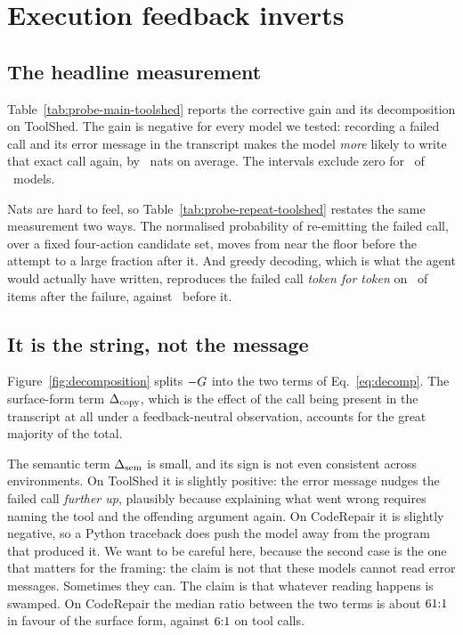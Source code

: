 \section{Execution feedback inverts}
\label{sec:results}

\subsection{The headline measurement}

Table~\ref{tab:probe-main-toolshed} reports the corrective gain and its
decomposition on ToolShed. The gain is negative for every model we tested:
recording a failed call and its error message in the transcript makes the model
\emph{more} likely to write that exact call again, by \MeanG\ nats on average.
The intervals exclude zero for \NumModelsNegativeG\ of
\NumModelsToolshed\ models.



Nats are hard to feel, so Table~\ref{tab:probe-repeat-toolshed} restates the
same measurement two ways. The normalised probability of re-emitting the failed
call, over a fixed four-action candidate set, moves from near the floor before
the attempt to a large fraction after it. And greedy decoding, which is what the agent would actually have written,
reproduces the failed call \emph{token for
token} on \GreedyPostMean\ of items after the failure, against \GreedyPreMean\
before it.



\subsection{It is the string, not the message}

Figure~\ref{fig:decomposition} splits $-G$ into the two terms of
Eq.~\eqref{eq:decomp}. The surface-form term $\Delta_{\mathrm{copy}}$, which is the effect of the call being
present in the transcript at all under a feedback-neutral observation,
accounts for the great majority of the total.

The semantic term $\Delta_{\mathrm{sem}}$ is small, and its sign is not even consistent
across environments. On ToolShed it is slightly positive: the error message
nudges the failed call \emph{further up}, plausibly because explaining what went
wrong requires naming the tool and the offending argument again. On CodeRepair
it is slightly negative, so a Python traceback does push the model away from the
program that produced it. We want to be careful here, because the second case is
the one that matters for the framing: the claim is not that these models cannot
read error messages. Sometimes they can. The claim is that whatever reading
happens is swamped. On CodeRepair the median ratio between the two terms is
about $61{:}1$ in favour of the surface form, against
$6{:}1$ on tool calls.

